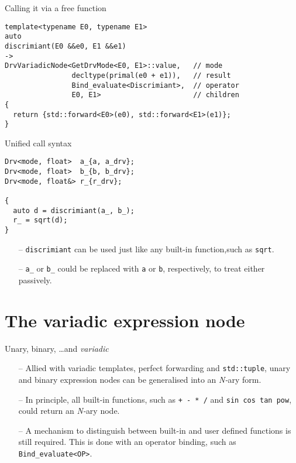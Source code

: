 \documentclass[xcolor=dvipsnames]{beamer}
\begin{document}
\begin{frame}[fragile]{Calling it via a free function}
\begin{lstlisting}
template<typename E0, typename E1>
auto
discrimiant(E0 &&e0, E1 &&e1)
->
DrvVariadicNode<GetDrvMode<E0, E1>::value,   // mode
                decltype(primal(e0 + e1)),   // result
                Bind_evaluate<Discrimiant>,  // operator
                E0, E1>                      // children
{
  return {std::forward<E0>(e0), std::forward<E1>(e1)};
}
\end{lstlisting}
\end{frame}


\begin{frame}[fragile]{Unified call syntax}
\begin{lstlisting}
Drv<mode, float>  a_{a, a_drv};
Drv<mode, float>  b_{b, b_drv};
Drv<mode, float&> r_{r_drv};

{
  auto d = discrimiant(a_, b_);
  r_ = sqrt(d);
}
\end{lstlisting}

\begin{itemize}
\item[--] {\color{red}\texttt{discrimiant}} can be used just like any built-in function,\newline such as \texttt{sqrt}. \vspace{3mm}
\item[--] \texttt{a\_} or \texttt{b\_} could be replaced with \texttt{a} or \texttt{b}, respectively, to treat either passively. \vspace{3mm}
\end{itemize}
\end{frame}


\section{The variadic expression node}


\begin{frame}[fragile]{Unary, binary, \ldots and \emph{variadic}}
\begin{itemize}
\item[--] Allied with variadic templates, perfect forwarding and \texttt{std::tuple}, unary and binary expression nodes can be generalised into an \emph{N-}ary form. \vspace{3mm}
\item[--] In principle, all built-in functions, such as \texttt{+ - * /} \; and \; \texttt{sin cos tan pow}, could return an \emph{N-}ary node. \vspace{3mm}
\item[--] A mechanism to distinguish between built-in and user defined functions is still required. This is done with an operator binding, such as \texttt{Bind\_evaluate<OP>}.
\end{itemize}
\end{frame}
\end{document}
